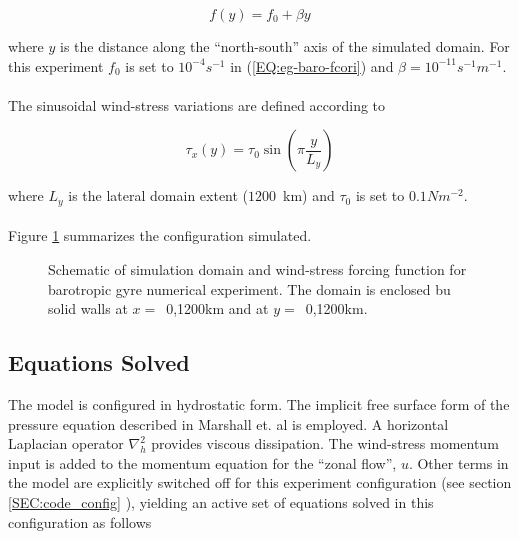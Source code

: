 \begin{equation}
\label{EQ:eg-baro-fcori}
f(y) = f_{0}+\beta y
\end{equation}
 
\noindent where $y$ is the distance along the ``north-south'' axis of the 
simulated domain. For this experiment $f_{0}$ is set to $10^{-4}s^{-1}$ in 
(\ref{EQ:eg-baro-fcori}) and $\beta = 10^{-11}s^{-1}m^{-1}$. 
\\
\\
 The sinusoidal wind-stress variations are defined according to 

\begin{equation}
\label{EQ:eg-baro-taux}
\tau_x(y) = \tau_{0}\sin(\pi \frac{y}{L_y})
\end{equation}
 
\noindent where $L_{y}$ is the lateral domain extent ($1200$~km) and 
$\tau_0$ is set to $0.1N m^{-2}$. 
\\
\\
Figure \ref{FIG:eg-baro-simulation_config}
summarizes the configuration simulated.

\begin{figure}
\centerline{
}
\caption{Schematic of simulation domain and wind-stress forcing function 
for barotropic gyre numerical experiment. The domain is enclosed bu solid
walls at $x=$~0,1200km and at $y=$~0,1200km.}
\label{FIG:eg-baro-simulation_config}
\end{figure}

\subsection{Equations Solved}
\label{www:tutorials}
The model is configured in hydrostatic form. The implicit free surface form of the
pressure equation described in Marshall et. al \cite{marshall:97a} is
employed.
A horizontal Laplacian operator $\nabla_{h}^2$ provides viscous
dissipation. The wind-stress momentum input is added to the momentum equation
for the ``zonal flow'', $u$. Other terms in the model
are explicitly switched off for this experiment configuration (see section
\ref{SEC:code_config} ), yielding an active set of equations solved in this
configuration as follows 

